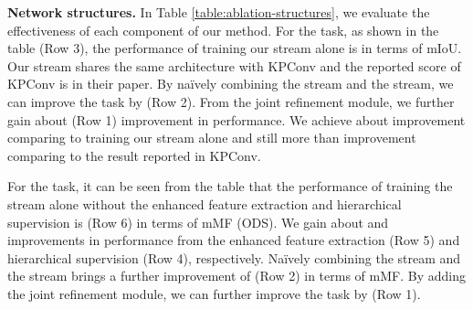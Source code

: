 \documentclass[runningheads]{llncs}
\begin{document}
\smallskip \noindent \textbf{Network structures.}
In Table \ref{table:ablation-structures}, we evaluate the effectiveness of each component of our method.
For the {\SemSeg} task, as shown in the table (Row 3),
the performance of training our {\SemSeg} stream alone
is  in terms of mIoU. Our {\SemSeg} stream shares the same architecture {with} KPConv and the reported score of KPConv is  in their paper. By na\"{i}vely
combining the {\SemSeg} stream and the {\SemEdgeD} stream, we can improve the {\SemSeg} task by  {(Row 2)}. From the joint refinement module, we further gain about {} {(Row 1)} improvement in performance. We achieve about  improvement comparing to training our {\SemSeg} stream alone and still more than  improvement comparing to the result reported in KPConv.  

For the {\SemEdgeD} task, it can be seen from the table that the performance of training the {\SemEdgeD} stream alone without the enhanced feature extraction and hierarchical supervision is  (Row 6) in terms of mMF (ODS). We gain about {} and  improvements in performance from the enhanced feature extraction (Row 5) and hierarchical supervision (Row 4), respectively. 
Na\"{i}vely combining the {\SemSeg} stream and the {\SemEdgeD} stream brings a {further} improvement of  {(Row 2)} in terms of mMF.
By adding the joint refinement module, we can further improve the {\SemEdgeD} task by  {(Row 1)}.
\end{document}
